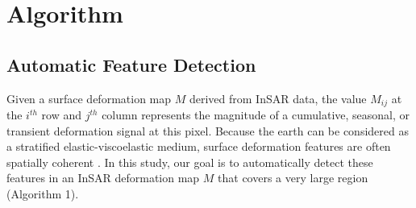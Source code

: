 





\section{Algorithm}
\label{sec:methods}

\subsection{Automatic Feature Detection}
\label{subsec:methods-1-log}

Given a surface deformation map $M$ derived from InSAR data, the value $ M_{ij} $ at the $i^{th}$ row and $j^{th}$ column represents the magnitude of a cumulative, seasonal, or transient deformation signal at this pixel. Because the earth can be considered as a stratified elastic-viscoelastic medium, surface deformation features are often spatially coherent \citep{Segall2010EarthquakeVolcanoDeformation}. In this study, our goal is to automatically detect these features in an InSAR deformation map $M$ that covers a very large region (Algorithm 1).

